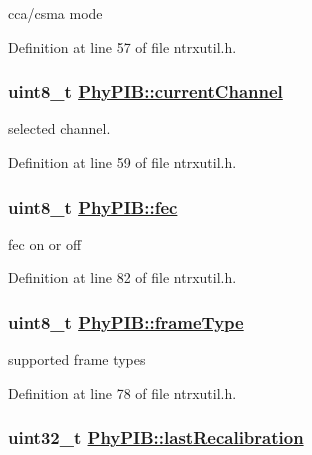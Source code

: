 cca/csma mode 

Definition at line 57 of file ntrxutil.h.\hypertarget{structPhyPIB_4793ae8a873bb85946ee9a68022111c0}{
\subsubsection[currentChannel]{\setlength{\rightskip}{0pt plus 5cm}uint8\_\-t \hyperlink{structPhyPIB_4793ae8a873bb85946ee9a68022111c0}{Phy\-PIB::current\-Channel}}}
\label{structPhyPIB_4793ae8a873bb85946ee9a68022111c0}


selected channel. 

Definition at line 59 of file ntrxutil.h.\hypertarget{structPhyPIB_10855487a6799bb4d208e1405a7bd466}{
\subsubsection[fec]{\setlength{\rightskip}{0pt plus 5cm}uint8\_\-t \hyperlink{structPhyPIB_10855487a6799bb4d208e1405a7bd466}{Phy\-PIB::fec}}}
\label{structPhyPIB_10855487a6799bb4d208e1405a7bd466}


fec on or off 

Definition at line 82 of file ntrxutil.h.\hypertarget{structPhyPIB_86e33c64b8d8ee7c9a79ccc1e370fd18}{
\subsubsection[frameType]{\setlength{\rightskip}{0pt plus 5cm}uint8\_\-t \hyperlink{structPhyPIB_86e33c64b8d8ee7c9a79ccc1e370fd18}{Phy\-PIB::frame\-Type}}}
\label{structPhyPIB_86e33c64b8d8ee7c9a79ccc1e370fd18}


supported frame types 

Definition at line 78 of file ntrxutil.h.\hypertarget{structPhyPIB_690daf620d0f7b7edc24bb67159b3ce6}{
\subsubsection[lastRecalibration]{\setlength{\rightskip}{0pt plus 5cm}uint32\_\-t \hyperlink{structPhyPIB_690daf620d0f7b7edc24bb67159b3ce6}{Phy\-PIB::last\-Recalibration}}}
\label{structPhyPIB_690daf620d0f7b7edc24bb67159b3ce6}


